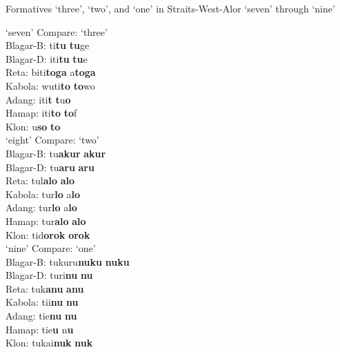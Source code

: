 Formatives `three', `two', and `one' in Straits-West-Alor `seven' through `nine' 



\let\eachwordone=\rm
\let\eachwordtwo=\it
\let\eachwordthree=\it
\let\eachwordfour=\it
\let\eachwordfive=\it
\let\eachwordsix=\it
\let\eachwordseven=\it
\let\eachwordeight=\it

\ea%
\label{ex:6:8} 
\ea 
\gllllllll {} 	`seven'	 Compare:	 `three'\\
{\rm Blagar-B:}	 {ti}\textbf{{tu}} {}	 \textbf{{tu}}{ge}\\
{\rm Blagar-D:}	 {{\texthtb}}{iti}\textbf{{tu}}	 {}	 \textbf{{tu}}{e}	 \\
{\rm Reta:}	 	{biti}\textbf{{toga}}\textbf{}	 {}	 {a}\textbf{{toga}}	 \\
{\rm Kabola:}	 	{wuti}\textbf{{to}}	 {}	 \textbf{{to}}{wo}\textbf{}	 \\
{\rm Adang:}	 	{iti}\textbf{{t}}{{\textopeno}}	 {}	 \textbf{{t}}{u}\textbf{{o}}\\
{\rm Hamap:}	 	{iti}\textbf{{to}}	 {}	 \textbf{{to}}{f}\\
{\rm Klon:}	 	{u}\textbf{{so{\ng}}} {}		 \textbf{{to{\ng}}}\textbf{}	 \\
\ex	 
\gllllllll {}		`eight'	 Compare:	 `two'\\
{\rm Blagar-B:}	 {tu}\textbf{{akur}}	 {}	 \textbf{{akur}}\\
{\rm Blagar-D:}	 {tu}\textbf{{aru}}	 {}	 \textbf{{aru}}	 \\
{\rm Reta:}		{tul}\textbf{{alo}} {}		 \textbf{{alo}}	 \\
{\rm Kabola:}	 	{tur}\textbf{{lo}}	 {}	 {a}\textbf{{lo}}\textbf{}	 \\
{\rm Adang:}		 {tur}\textbf{{lo}}	 {}	 {a}\textbf{{lo}}\\
{\rm Hamap:}	 	{tur}\textbf{{alo}}	 {}	 \textbf{{alo}}\\
{\rm Klon:}	 	{tid}\textbf{{orok}} {}		 \textbf{{orok}}\textbf{}	 \\
\ex	 
\gllllllll {}	`nine'	 Compare:	 `one'\\
{\rm Blagar-B:}	 {tukuru}\textbf{{nuku}} {}		 \textbf{{nuku}}	 \\
{\rm Blagar-D:}	 {turi}\textbf{{nu}}	 {}	 \textbf{{nu}}	 \\
{\rm Reta:}	 	{tuk}\textbf{{anu}}	 {}	 \textbf{{anu}}\\
{\rm Kabola:}	 	{ti}{{\textglotstop}i}\textbf{{nu}} {}		 \textbf{{nu}}\textbf{}	 \\
{\rm Adang:}	 	{ti}{{\textglotstop}e}\textbf{{nu}} {}		 \textbf{{nu}}\textbf{}	 \\
{\rm Hamap:}		 {tie}\textbf{{u}}	 {}	 {n}\textbf{{u}}\textbf{}	 \\
{\rm Klon:}	 	{tukai}\textbf{{nuk}}	 {}	 \textbf{{nuk}}\\
\z
\z

